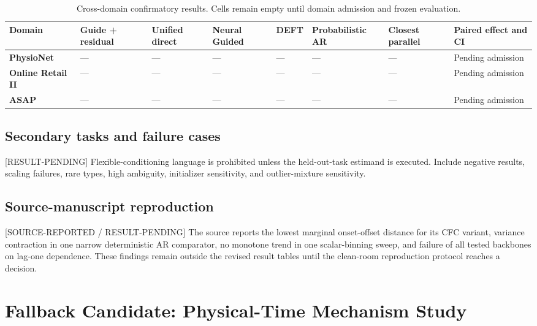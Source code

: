 \documentclass[11pt]{article}
\newcommand{\status}[1]{%
  \textcolor{statusred}{\textbf{\texttt{[#1]}}}%
}
\def\status#1{[#1]}%
\begin{document}
\begin{landscape}
\begin{table}[p]
\centering
\scriptsize
\renewcommand{\arraystretch}{1.18}
\setlength{\tabcolsep}{3.5pt}
\caption{Cross-domain confirmatory results. Cells remain empty until domain admission and frozen evaluation.}\label{tab:cross-domain-results}
\begin{tabularx}{\linewidth}{@{}*{8}{Y}@{}}
\toprule
\textbf{Domain} & \textbf{Guide + residual} & \textbf{Unified direct} & \textbf{Neural Guided} & \textbf{DEFT} & \textbf{Probabilistic AR} & \textbf{Closest parallel} & \textbf{Paired effect and CI} \\
\midrule
\textbf{PhysioNet} & --- & --- & --- & --- & --- & --- & Pending admission \\
\textbf{Online Retail II} & --- & --- & --- & --- & --- & --- & Pending admission \\
\textbf{ASAP} & --- & --- & --- & --- & --- & --- & Pending admission \\
\bottomrule
\end{tabularx}
\end{table}
\end{landscape}

\subsection{Secondary tasks and failure cases}
\label{sec:secondary-tasks-and-failure-cases}

\status{RESULT-PENDING} Flexible-conditioning language is prohibited unless the held-out-task estimand is executed. Include negative results, scaling failures, rare types, high ambiguity, initializer sensitivity, and outlier-mixture sensitivity.

\subsection{Source-manuscript reproduction}
\label{sec:source-manuscript-reproduction}

\status{SOURCE-REPORTED /\allowbreak{} RESULT-PENDING} The source reports the lowest marginal onset-offset distance for its CFC variant, variance contraction in one narrow deterministic AR comparator, no monotone trend in one scalar-binning sweep, and failure of all tested backbones on lag-one dependence. These findings remain outside the revised result tables until the clean-room reproduction protocol reaches a decision.

\section{Fallback Candidate: Physical-Time Mechanism Study}
\label{sec:fallback-candidate-physical-time-mechanism-study}
\end{document}
